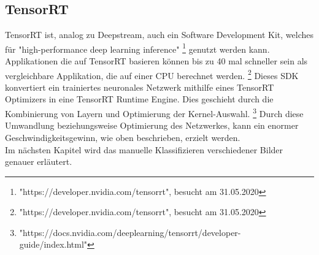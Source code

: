 \documentclass[a4paper,oneside,12pt]{report}
\begin{document}
\begin{onehalfspace}
		\subsection{TensorRT}
		TensorRT ist, analog zu Deepstream, auch ein Software Development Kit, welches für "high-performance deep learning inference"
		\footnote{"https://developer.nvidia.com/tensorrt", besucht am 31.05.2020} genutzt werden kann.
		Applikationen die auf TensorRT basieren können bis zu 40 mal schneller sein als vergleichbare Applikation, die auf einer CPU berechnet werden.
		\footnote{"https://developer.nvidia.com/tensorrt", besucht am 31.05.2020}
		Dieses SDK konvertiert ein trainiertes neuronales Netzwerk mithilfe eines TensorRT Optimizers in eine TensorRT Runtime Engine. Dies geschieht durch die Kombinierung von Layern und Optimierung der Kernel-Auswahl.
		\footnote{"https://docs.nvidia.com/deeplearning/tensorrt/developer-guide/index.html"}
		Durch diese Umwandlung beziehungsweise Optimierung des Netzwerkes, kann ein enormer Geschwindigkeitsgewinn, wie oben beschrieben, erzielt werden. \\
		Im nächsten Kapitel wird das manuelle Klassifizieren verschiedener Bilder genauer erläutert.
	\end{onehalfspace}
\end{document}
